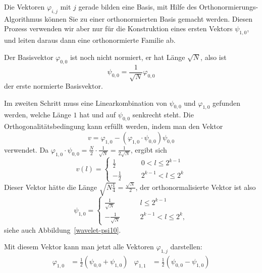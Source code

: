 Die Vektoren $\varphi_{i,j}$ mit $j$ gerade bilden eine Basis,
mit Hilfe des Orthonormierungs-Algorithmus können Sie zu einer
orthonormierten Basis gemacht werden. Diesen Prozess verwenden
wir aber nur für die Konstruktion eines ersten Vektors $\psi_{1,0}$,
und leiten daraus dann eine orthonormierte Familie ab.

Der Basisvektor $\varphi_{0,0}$ ist noch nicht
normiert, er hat Länge $\sqrt{N}$, also ist
$$
\psi_{0,0}=\frac1{\sqrt{N}}\varphi_{0,0}
$$
der erste normierte Basisvektor.

Im zweiten Schritt muss eine Linearkombination von $\psi_{0,0}$
und $\varphi_{1,0}$ gefunden werden, welche Länge $1$ hat und
auf $\psi_{0,0}$ senkrecht steht. Die Orthogonalitätsbedingung
kann erfüllt werden, indem man den Vektor
\[
v=\varphi_{1,0}-(\varphi_{1,0}\cdot\psi_{0,0})\psi_{0,0}
\]
verwendet. Da $\varphi_{1,0}\cdot\psi_{0,0}=\frac{N}2\cdot\frac1{\sqrt{N}}
=\frac1{2\sqrt{N}}$,
ergibt sich
\[
v(l)=\begin{cases}
\frac12&\qquad 0<l\le 2^{k-1}\\
-\frac12&\qquad 2^{k-1}<l\le 2^{k}
\end{cases}
\]
Dieser Vektor hätte die Länge $\sqrt{N\frac14}=\frac{\sqrt{N}}2$,
der orthonormalisierte Vektor ist also
\[
\psi_{1,0}=\begin{cases}
\frac1{\sqrt{N}}&\qquad l\le 2^{k-1}\\
-\frac{1}{\sqrt{N}}&\qquad 2^{k-1}<l\le 2^{k},
\end{cases}
\]
siehe auch Abbildung~\ref{wavelet-psi10}.

Mit diesem Vektor kann man jetzt alle Vektoren $\varphi_{1,j}$
darstellen:
\begin{align}
\varphi_{1,0}&=\frac12(\psi_{0,0}+\psi_{1,0})
&
\varphi_{1,1}&=\frac12(\psi_{0,0}-\psi_{1,0})
\label{psikonstruktion}
\end{align}

